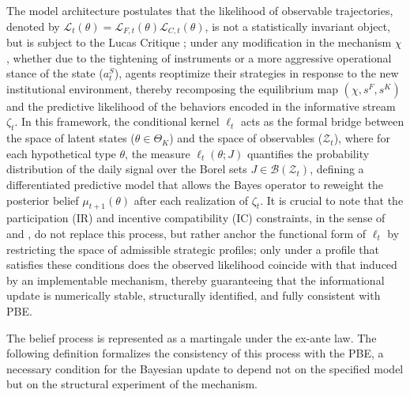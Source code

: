 \documentclass[pdflatex,sn-mathphys-ay]{sn-jnl}
\theoremstyle{plain}
\theoremstyle{definition}
\newcommand{\ThetaK}{\Theta_K}
\newcommand{\1}{\mathbf{1}}
\begin{document}
The model architecture postulates that the likelihood of observable trajectories, denoted by $\mathcal{L}_t(\theta)=\mathcal{L}_{F,t}(\theta)\mathcal{L}_{C,t}(\theta)$, is not a statistically invariant object, but is subject to the Lucas Critique \citeyearpar{Lucas1976}; under any modification in the mechanism $\chi$, whether due to the tightening of instruments or a more aggressive operational stance of the state ($a_t^S$), agents reoptimize their strategies in response to the new institutional environment, thereby recomposing the equilibrium map $(\chi, s^F, s^K)$ and the predictive likelihood of the behaviors encoded in the informative stream $\zeta_t$. In this framework, the conditional kernel $\ell_t$ acts as the formal bridge between the space of latent states ($\theta \in \ThetaK$) and the space of observables ($\mathcal{Z}_t$), where for each hypothetical type $\theta$, the measure $\ell_t(\theta; J)$ quantifies the probability distribution of the daily signal over the Borel sets $J \in \mathcal{B}(\mathcal{Z}_t)$, defining a differentiated predictive model that allows the Bayes operator to reweight the posterior belief $\mu_{t+1}(\theta)$ after each realization of $\zeta_t$. It is crucial to note that the participation (IR) and incentive compatibility (IC) constraints, in the sense of \citet{Myerson1979IC} and \citet{BoltonDewatripont2005}, do not replace this process, but rather anchor the functional form of $\ell_t$ by restricting the space of admissible strategic profiles; only under a profile that satisfies these conditions does the observed likelihood coincide with that induced by an implementable mechanism, thereby guaranteeing that the informational update is numerically stable, structurally identified, and fully consistent with PBE.

The belief process is represented as a martingale under the ex-ante law. The following definition formalizes the consistency of this process with the PBE, a necessary condition for the Bayesian update to depend not on the specified model but on the structural experiment of the mechanism.
\end{document}
